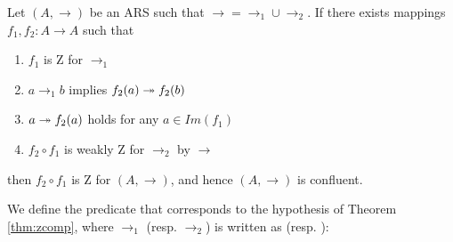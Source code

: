     \begin{theorem}\cite{Nakazawa-Fujita2016}\label{thm:zcomp} Let $(A,\to)$ be an ARS such that $\to = \to_1 \cup \to_2$. If there exists mappings $f_1,f_2: A \to A$ such that \begin{enumerate} \item $f_1$ is Z for $\to_1$ \item $a \to_1 b$ implies $f_2(a) \twoheadrightarrow f_2(b)$ \item $a \twoheadrightarrow f_2(a)$ holds for any $a\in Im(f_1)$ \item $f_2 \circ f_1$ is weakly Z for $\to_2$ by $\to$ \end{enumerate} then $f_2 \circ f_1$ is Z for $(A,\to)$, and hence $(A,\to)$ is confluent.  \end{theorem}


    We define the predicate  that corresponds to the hypothesis of Theorem \ref{thm:zcomp}, where $\to_1$ (resp. $\to_2$) is written as  (resp. ): \begin{coqdoccode}
\coqdocemptyline
\coqdocnoindent

\end{coqdoccode}
